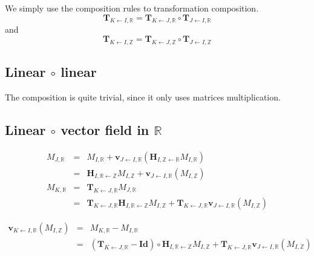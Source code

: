 We simply use the composition rules to  transformation composition.
\begin{displaymath}
\mathbf{T}_{K \leftarrow I, \mathbb{R}}
= 
\mathbf{T}_{K \leftarrow J, \mathbb{R}}
\circ
\mathbf{T}_{J \leftarrow I, \mathbb{R}}
\end{displaymath}
and
\begin{displaymath}
\mathbf{T}_{K \leftarrow I, \mathbb{Z}}
= 
\mathbf{T}_{K \leftarrow J, \mathbb{Z}}
\circ
\mathbf{T}_{J \leftarrow I, \mathbb{Z}}
\end{displaymath}



\subsection{Linear $\circ$ linear}

The composition is quite trivial, since it only uses matrices multiplication.



\subsection{Linear $\circ$ vector field in $\mathbb{R}$ }

\begin{eqnarray*}
M_{J, \mathbb{R}} & = &
M_{I, \mathbb{R}} 
+ \mathbf{v}_{J \leftarrow I, \mathbb{R}}
(\mathbf{H}_{I, \mathbb{Z} \leftarrow \mathbb{R}}  M_{I, \mathbb{R}}) \\
& = & 
\mathbf{H}_{I, \mathbb{R} \leftarrow \mathbb{Z}} M_{I, \mathbb{Z}}
+ \mathbf{v}_{J \leftarrow I, \mathbb{R}}(M_{I, \mathbb{Z}}) \\
M_{K, \mathbb{R}} & = &
 \mathbf{T}_{K \leftarrow J, \mathbb{R}} M_{J, \mathbb{R}} \\
& = &
\mathbf{T}_{K \leftarrow J, \mathbb{R}} 
\mathbf{H}_{I, \mathbb{R} \leftarrow \mathbb{Z}} 
M_{I, \mathbb{Z}} 
+ \mathbf{T}_{K \leftarrow J, \mathbb{R}} 
\mathbf{v}_{J \leftarrow I, \mathbb{R}}(M_{I, \mathbb{Z}})
\end{eqnarray*}

\begin{eqnarray*}
\mathbf{v}_{K \leftarrow I, \mathbb{R}}(M_{I, \mathbb{Z}})
& = &
M_{K, \mathbb{R}} - M_{I, \mathbb{R}} \\
& = &
\left( \mathbf{T}_{K \leftarrow J, \mathbb{R}} - \mathbf{Id} \right)
\circ 
\mathbf{H}_{I, \mathbb{R} \leftarrow \mathbb{Z}} 
M_{I, \mathbb{Z}} 
+ \mathbf{T}_{K \leftarrow J, \mathbb{R}} 
\mathbf{v}_{J \leftarrow I, \mathbb{R}}(M_{I, \mathbb{Z}})
\end{eqnarray*}



